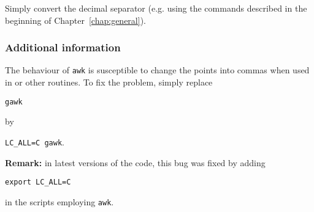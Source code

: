 Simply convert the decimal separator (e.g. using the commands described in the beginning of Chapter~\ref{chap:general}).


\subsubsection{Additional information}

The behaviour of \texttt{awk} is susceptible to change the points into commas when used in  or other routines. To fix the problem, simply replace

\texttt{gawk}

by

\texttt{LC\_ALL=C gawk}.

\textbf{Remark:} in latest versions of the code, this bug was fixed by adding 

\texttt{export LC\_ALL=C}

in the scripts employing \texttt{awk}.